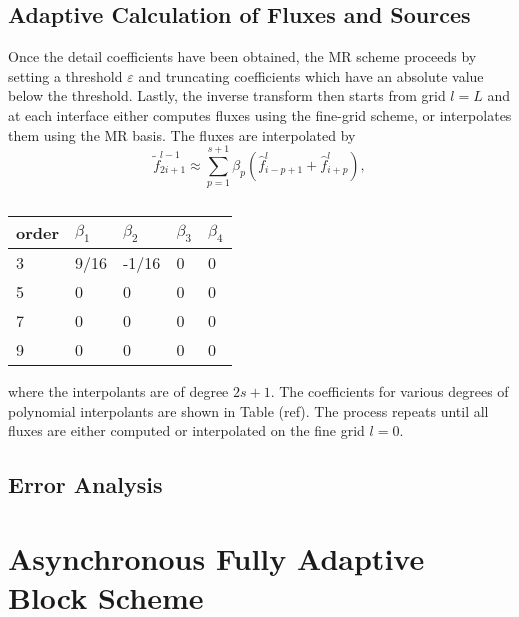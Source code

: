 \documentclass[12pt,letterpaper]{article}
\begin{document}
    \subsection*{Adaptive Calculation of Fluxes and Sources}

        Once the detail coefficients have been obtained, the MR scheme
        proceeds by setting a threshold $\varepsilon$ and truncating coefficients
        which have an absolute value below the threshold. Lastly, the inverse
        transform then starts from grid $l=L$ and at each interface either
        computes fluxes using the fine-grid scheme, or interpolates them using
        the MR basis. The fluxes are interpolated by
        \begin{equation}
            \tilde{f}_{2i+1}^{l-1} \approx \sum_{p=1}^{s+1} \beta_{p} \left(
            \hat{f}^{l}_{i-p+1} + \hat{f}^{l}_{i+p} \right),
        \end{equation}
        \begin{table}[]
            \center
            \begin{tabular}{|l|l|l|l|l|}
            \hline
                order    & $\beta_{1}$ & $\beta_{2}$ & $\beta_{3}$ & $\beta_{4}$ \\ \hline
                3 & 9/16         & -1/16        & 0            & 0            \\ \hline
                5 & 0            & 0            & 0            & 0            \\ \hline
                7 & 0            & 0            & 0            & 0            \\ \hline
                9 & 0            & 0            & 0            & 0            \\ \hline
            \end{tabular}
            \label{coeff1}
            \caption{}
        \end{table}
        where the interpolants are of degree $2s+1$. The coefficients for
        various degrees of polynomial interpolants are shown in Table (ref).
        The process repeats until all fluxes are either computed or
        interpolated on the fine grid $l=0$.

    \subsection*{Error Analysis}

\section{Asynchronous Fully Adaptive Block Scheme}
\end{document}
